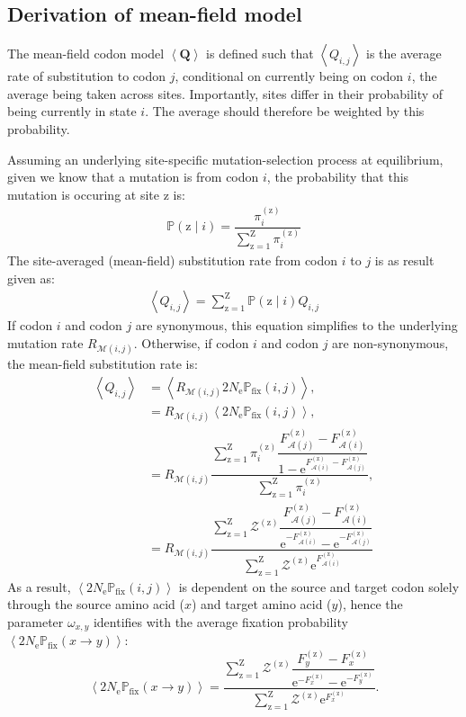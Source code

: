 \documentclass{article}
\newcommand{\BiDimArray}[1]{\bm{#1}} %
\newcommand{\e}{\text{e}} %
\newcommand{\Ne}{N_{\text{e}}} %
\newcommand{\proba}{\mathbb{P}} %
\newcommand{\Pfix}{2 \Ne \proba_{\text{fix}}} %
\newcommand{\mutmatrix}{R} %
\newcommand{\ci}{{i}} %
\newcommand{\cj}{{j}} %
\newcommand{\itoj}{\ci, \cj} %
\newcommand{\nuc}{\mathcal{M}} %
\newcommand{\nucitoj}{\nuc(\itoj)} %
\newcommand{\submatrix}{Q} %
\newcommand{\Submatrix}{\BiDimArray{\submatrix}} %
\newcommand{\subequi}{\pi} %
\newcommand{\aaSource}{x} %
\newcommand{\aaTarget}{y} %
\newcommand{\aaMap}{\mathcal{A}} %
\newcommand{\aai}{\aaMap(\ci)} %
\newcommand{\aaj}{\aaMap(\cj)} %
\newcommand{\avgpfixAA}{\left\langle \Pfix \left( \aaSource \to \aaTarget \right) \right\rangle } %
\newcommand{\scaledfit}{F} %
\newcommand{\FitaaSource}{\scaledfit_{\aaSource}} %
\newcommand{\FitaaTarget}{\scaledfit_{\aaTarget}} %
\newcommand{\Fiti}{\scaledfit_{\aai}} %
\newcommand{\Fitj}{\scaledfit_{\aaj}} %
\newcommand{\site}{\text{z}} %
\newcommand{\Nsite}{\text{Z}} %
\newcommand{\siteexp}{^{(\site)}} %
\newcommand{\sumSetsite}{_{\site=1}^{\Nsite} } %
\begin{document}
\subsection{Derivation of mean-field model}
\label{subsec:mean-field-derivation}
The mean-field codon model $\left\langle \Submatrix \right\rangle$ is defined such that $\left\langle \submatrix_{\itoj} \right\rangle$ is the average rate of {substitution} to codon $\cj$, conditional on currently being on codon $\ci$, the average being taken across sites.
Importantly, sites differ in their probability of being currently in state $\ci$.
The average should therefore be weighted by this probability.

Assuming an underlying site-specific mutation-selection process at equilibrium, given we know that a mutation is from codon $\ci$, the probability that this mutation is occuring at site $\site$ is:
\begin{align}
 \proba (\site \mid \ci) = \dfrac{ \subequi_{\ci}\siteexp }{\sum\limits\sumSetsite \subequi_{\ci}\siteexp }
\end{align}
The site-averaged (mean-field) {substitution} rate from codon $\ci$ to $\cj$ is as result given as:
\begin{align}
 \left\langle \submatrix_{\itoj} \right\rangle = \sum\limits\sumSetsite \proba (\site \mid \ci) \submatrix_{\itoj}
\end{align}
If codon $\ci$ and codon $\cj$ are {synonymous}, this equation simplifies to the underlying mutation rate $\mutmatrix_{\nucitoj}$.
Otherwise, if codon $\ci$ and codon $\cj$ are {non-synonymous}, the mean-field {substitution} rate is:
\begin{align}
 \left\langle \submatrix_{\itoj} \right\rangle & = \left\langle \mutmatrix_{\nucitoj} \Pfix (\itoj) \right\rangle, \\
 & = \mutmatrix_{\nucitoj} \left\langle \Pfix (\itoj) \right\rangle, \\
 & = \mutmatrix_{\nucitoj} \dfrac{ \sum\limits\sumSetsite \subequi_{\ci}\siteexp \dfrac{\Fitj\siteexp - \Fiti\siteexp}{1 - \e^{\Fiti\siteexp - \Fitj\siteexp}} }{ \sum\limits\sumSetsite \subequi_{\ci}\siteexp }, \\
 & = \mutmatrix_{\nucitoj} \dfrac{ \sum\limits\sumSetsite \mathcal{Z}\siteexp \dfrac{\Fitj\siteexp - \Fiti\siteexp}{ \e^{-\Fiti\siteexp} - \e^{ - \Fitj\siteexp}} }{ \sum\limits\sumSetsite \mathcal{Z}\siteexp \e^{\Fiti\siteexp} }
\end{align}
As a result, $\left\langle \Pfix (\itoj) \right\rangle$ is dependent on the source and target codon solely through the source amino acid ($\aaSource$) and target amino acid ($\aaTarget$), hence the parameter $\omega_{\aaSource, \aaTarget}$ identifies with the average fixation probability $\avgpfixAA$:
\begin{equation}
 \label{eq:omega_pairs_predicted} \avgpfixAA = \dfrac{ \sum\limits\sumSetsite \mathcal{Z}\siteexp \dfrac{\FitaaTarget\siteexp - \FitaaSource\siteexp}{ \e^{-\FitaaSource\siteexp} - \e^{ - \FitaaTarget\siteexp}} }{ \sum\limits\sumSetsite \mathcal{Z}\siteexp \e^{\FitaaSource\siteexp} }.
\end{equation}
\end{document}
